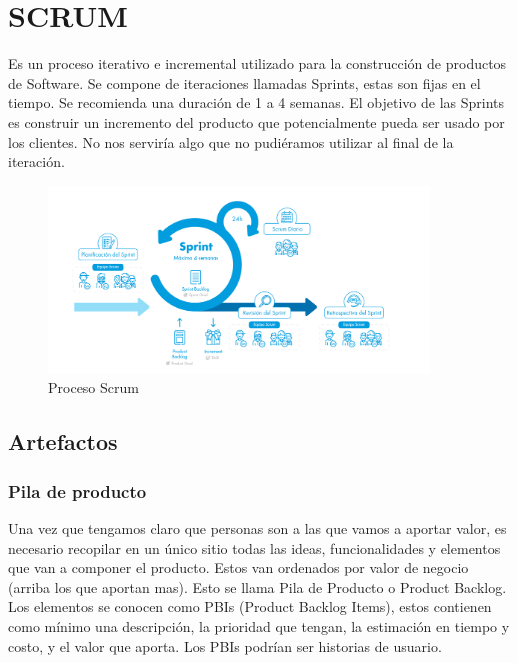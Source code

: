 \documentclass[titlepage,a4paper]{article}
\begin{document}
\newpage

\section{SCRUM}
Es un proceso iterativo e incremental utilizado para la construcción de productos de Software. Se compone de iteraciones llamadas Sprints, estas son fijas en el tiempo. Se recomienda una duración de 1 a 4 semanas. El objetivo de las Sprints es construir un incremento del producto que potencialmente pueda ser usado por los clientes. No nos serviría algo que no pudiéramos utilizar al final de la iteración.

\begin{figure}[!htb]
    \centering
    \includegraphics[width=0.9\textwidth]{Imagenes/Scrum.png}
    \caption{Proceso Scrum}
\end{figure}

\subsection{Artefactos}

\subsubsection*{Pila de producto}
Una vez que tengamos claro que personas son a las que vamos a aportar valor, es necesario recopilar en un único sitio todas las ideas, funcionalidades y elementos que van a componer el producto. Estos van ordenados por valor de negocio (arriba los que aportan mas). Esto se llama Pila de Producto o Product Backlog. Los elementos se conocen como PBIs (Product Backlog Items), estos contienen como mínimo una descripción, la prioridad que tengan, la estimación en tiempo y costo, y el valor que aporta. Los PBIs podrían ser historias de usuario.
\end{document}
